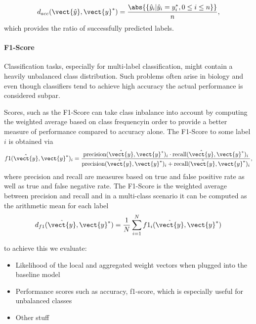 \begin{equation}
    d_{acc}(\vect{\hat{y}}, \vect{y}^*) = \frac{\abs{\{\hat{y}_i \lvert \hat{y}_i = y^*_i, 0 \leq i \leq n\}}}{n}, 
\end{equation}
which provides the ratio of successfully predicted labels. 

\paragraph*{F1-Score}
Classification tasks, especially for multi-label classification, might contain a heavily unbalanced class distribution. 
Such problems often arise in biology\cite{sonnenburg2007accurate} and even though classifiers tend to achieve high accuracy the actual performance is considered subpar.

Scores, such as the F1-Score can take class inbalance into account by computing the weighted average based on class frequencyin order to provide a better measure of performance compared to accuracy alone.
The F1-Score \wrt to some label $i$ is obtained via 
\begin{equation}
    f1(\hat{\vect{y}},\vect{y}^*)_i = \frac{\text{precision}(\hat{\vect{y}},\vect{y}^*)_i \cdot \text{recall}(\hat{\vect{y}},\vect{y}^*)_i}{\text{precision}(\hat{\vect{y}},\vect{y}^*)_i + \text{recall}(\hat{\vect{y}},\vect{y}^*)_i},
\end{equation}
where precision and recall are measures based on true and false positive rate as well as true and false negative rate.\cite{friedman2001elements} \cite{hossin2015review}
The F1-Score is the weighted average between precision and recall and in a multi-class scenario it can be computed as the arithmetic mean for each label
\begin{equation}
    d_{f1}(\hat{\vect{y}},\vect{y}^*) = \frac{1}{N} \sum_{i=1}^N f1_i(\hat{\vect{y}},\vect{y}^*)
\end{equation}


to achieve this we evaluate:

\begin{itemize}
    \item Likelihood of the local and aggregated weight vectors when plugged into the baseline model 
    \item Performance scores such as accuracy, f1-score, which is especially useful for unbalanced classes 
    \item Other stuff 
\end{itemize}
